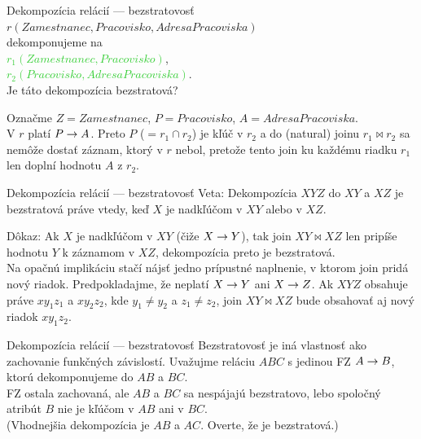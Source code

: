 \documentclass[12pt]{beamer}
\def\blue#1{\textcolor{Cerulean}{#1}}
\def\green#1{\textcolor{LimeGreen}{#1}}
\begin{document}
\begin{frame}[fragile]{Dekompozícia relácií --- bezstratovosť}
\blue{$r(Zamestnanec, Pracovisko, AdresaPracoviska)$}\\
dekomponujeme na\\
\green{$r_1(Zamestnanec, Pracovisko)$},\\
\green{$r_2(Pracovisko, AdresaPracoviska)$}.\\
Je táto dekompozícia bezstratová?
\pause

\bigskip
Označme $Z = Zamestnanec$, $P = Pracovisko$, $A = AdresaPracoviska$.\\[2mm]
V $r$ platí $P\rightarrow A$. Preto $P$ ($= r_1\cap r_2$) je kľúč v $r_2$ a do (natural) joinu $r_1\bowtie r_2$
sa nemôže dostať záznam, ktorý v $r$ nebol, pretože tento join ku každému riadku $r_1$ len doplní hodnotu $A$ z $r_2$.
\end{frame}

\begin{frame}[fragile]{Dekompozícia relácií --- bezstratovosť}
Veta: Dekompozícia $XYZ$ do $XY$ a $XZ$ je bezstratová práve vtedy, keď $X$ je nadkľúčom v $XY$ alebo v $XZ$.
\\[5mm]
\pause

Dôkaz: Ak $X$ je nadkľúčom v $XY$ (čiže $X\rightarrow Y$), tak join $XY\bowtie XZ$ len pripíše hodnotu $Y$ k záznamom v $XZ$, dekompozícia preto je bezstratová.
\\[5mm]

Na opačnú implikáciu stačí nájsť jedno prípustné naplnenie, v ktorom join pridá nový riadok.
Predpokladajme, že neplatí $X\rightarrow Y$ ani $X\rightarrow Z$.
Ak $XYZ$ obsahuje práve $xy_1z_1$ a $xy_2z_2$, kde $y_1\ne y_2$ a $z_1\ne z_2$,
join $XY\bowtie XZ$ bude obsahovať aj nový riadok $xy_1z_2$.
\end{frame}

\begin{frame}[fragile]{Dekompozícia relácií --- bezstratovosť}
Bezstratovosť je iná vlastnosť ako zachovanie funkčných závislostí.
Uvažujme reláciu $ABC$ s jedinou FZ $A\rightarrow B$, ktorú dekomponujeme do $AB$ a $BC$.
\\[5mm]

FZ ostala zachovaná, ale $AB$ a $BC$ sa nespájajú bezstratovo, lebo spoločný atribút $B$ nie je kľúčom v $AB$ ani v $BC$.
\\[5mm]

(Vhodnejšia dekompozícia je $AB$ a $AC$. Overte, že je bezstratová.)
\end{frame}
\end{document}
